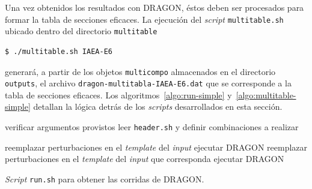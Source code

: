 \documentclass[11pt]{article}
\begin{document}
Una vez obtenidos los resultados con DRAGON, éstos deben ser procesados para formar la tabla de secciones eficaces. La ejecución del \emph{script} \texttt{multitable.sh} ubicado dentro del directorio \texttt{multitable}

\begin{lstlisting}[style=bash_tecna]
$ ./multitable.sh IAEA-E6 
\end{lstlisting}

\noindent
generará, a partir de los objetos \texttt{multicompo} almacenados en el directorio \texttt{outputs}, el archivo \texttt{dragon-multitabla-IAEA-E6.dat} que se corresponde a la tabla de secciones eficaces. Los algoritmos~\ref{algo:run-simple} y~\ref{algo:multitable-simple} detallan la lógica detrás de los \emph{scripts} desarrollados en esta sección.

\medskip
\begin{algorithm}[H]
 
 
 verificar argumentos provistos\;
 leer \texttt{header.sh} y definir combinaciones a realizar\;
  
 reemplazar perturbaciones en el \emph{template} del \emph{input}\;
 ejecutar DRAGON\;
 reemplazar perturbaciones en el \emph{template} del \emph{input} que corresponda\;
 ejecutar DRAGON\;
\caption{\emph{Script} \texttt{run.sh} para obtener las corridas de DRAGON.\label{algo:run-simple}}
\end{algorithm}
\medskip
\end{document}
